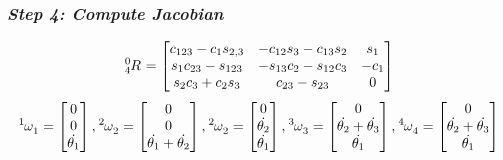 \documentclass[10pt]{article}
\begin{document}
\subsubsection*{\textbf{\textit{Step 4: Compute Jacobian}}}
\[
\tensor*[^{0}_{4}]{R}{} =
\begin{bmatrix}
c_{123}-c_{1}s_{2,3}   & -c_{12}s_{3}-c_{13}s_{2} & s_{1} \\
s_{1}c_{23}-s_{123}    & -s_{13}c_{2}-s_{12}c_{3} & -c_{1}\\
s_{2}c_{3}+c_{2}s_{3}  & c_{23}-s_{23}            & 0      
\end{bmatrix}
\]
\[
\tensor*[^{1}]{\omega}{_1} =
\begin{bmatrix}
0 \\
0 \\
\dot{\theta_{1}}   
\end{bmatrix},
\tensor*[^{2}]{\omega}{_2} =
\begin{bmatrix}
0 \\
0 \\
\dot{\theta_{1}} + \dot{\theta_{2}} 
\end{bmatrix},
\tensor*[^{2}]{\omega}{_2} =
\begin{bmatrix}
0 \\
\dot{\theta_{2}} \\
\dot{\theta_{1}}  
\end{bmatrix},
\tensor*[^{3}]{\omega}{_3} =
\begin{bmatrix}
0 \\
\dot{\theta_{2}} + \dot{\theta_{3}} \\
\dot{\theta_{1}}  
\end{bmatrix},
\tensor*[^{4}]{\omega}{_4} =
\begin{bmatrix}
0 \\
\dot{\theta_{2}} + \dot{\theta_{3}} \\
\dot{\theta_{1}}  
\end{bmatrix}
\]
\end{document}
